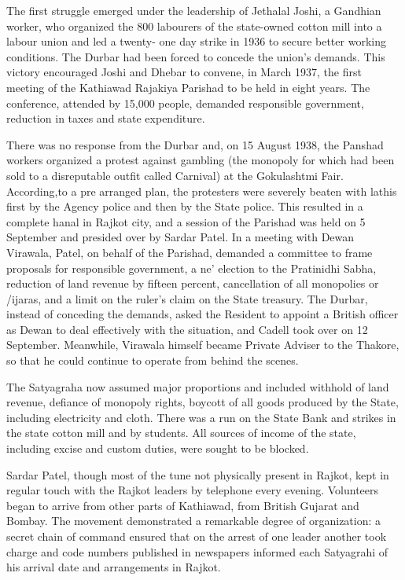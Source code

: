 The first struggle emerged under the leadership of Jethalal Joshi, a Gandhian worker, who organized the 800 labourers of the state-owned cotton mill into a labour union and led a twenty- one day strike in 1936 to secure better working conditions. The Durbar had been forced to concede the union’s demands. This victory encouraged Joshi and Dhebar to convene, in March 1937, the first meeting of the Kathiawad Rajakiya Parishad to be held in eight years. The conference, attended by 15,000 people, demanded responsible government, reduction in taxes and state expenditure. 

There was no response from the Durbar and, on 15 August 1938, the Panshad workers organized a protest against gambling (the monopoly for which had been sold to a disreputable outfit called Carnival) at the Gokulashtmi Fair. According,to a pre­ arranged plan, the protesters were severely beaten with lathis first by the Agency police and then by the State police. This resulted in a complete hanal in Rajkot city, and a session of the Parishad was held on 5 September and presided over by Sardar Patel. In a meeting with Dewan Virawala, Patel, on behalf of the Parishad, demanded a committee to frame proposals for responsible government, a ne’ election to the Pratinidhi Sabha, reduction of land revenue by fifteen percent, cancellation of all monopolies or /ijaras, and a limit on the ruler’s claim on the State treasury. The Durbar, instead of conceding the demands, asked the Resident to appoint a British officer as Dewan to deal effectively with the situation, and Cadell took over on 12 September. Meanwhile, Virawala himself became Private Adviser to the Thakore, so that he could continue to operate from behind the scenes. 

The Satyagraha now assumed major proportions and included withhold of land revenue, defiance of monopoly rights, boycott of all goods produced by the State, including electricity and cloth. There was a run on the State Bank and strikes in the state cotton mill and by students. All sources of income of the state, including excise and custom duties, were sought to be blocked. 

Sardar Patel, though most of the tune not physically present in Rajkot, kept in regular touch with the Rajkot leaders by telephone every evening. Volunteers began to arrive from other parts of Kathiawad, from British Gujarat and Bombay. The movement demonstrated a remarkable degree of organization: a secret chain of command ensured that on the arrest of one leader another took charge and code numbers published in newspapers informed each Satyagrahi of his arrival date and arrangements in Rajkot. 

